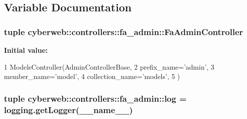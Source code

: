 \subsection{\-Variable \-Documentation}
\hypertarget{namespacecyberweb_1_1controllers_1_1fa__admin_ac7a3e431d03b1d894e586decd1ca3787}{
\subsubsection[{\-Fa\-Admin\-Controller}]{\setlength{\rightskip}{0pt plus 5cm}tuple {\bf cyberweb\-::controllers\-::fa\-\_\-admin\-::\-Fa\-Admin\-Controller}}}\label{namespacecyberweb_1_1controllers_1_1fa__admin_ac7a3e431d03b1d894e586decd1ca3787}
{\bfseries \-Initial value\-:}
\begin{DoxyCode}
1 ModelsController(AdminControllerBase,
2                                    prefix_name='admin',
3                                    member_name='model',
4                                    collection_name='models',
5                                   )
\end{DoxyCode}
\hypertarget{namespacecyberweb_1_1controllers_1_1fa__admin_a2b4a9ca0cc2ec112076b1dd88bf56bbb}{
\subsubsection[{log}]{\setlength{\rightskip}{0pt plus 5cm}tuple {\bf cyberweb\-::controllers\-::fa\-\_\-admin\-::log} = logging.\-get\-Logger(\-\_\-\-\_\-name\-\_\-\-\_\-)}}\label{namespacecyberweb_1_1controllers_1_1fa__admin_a2b4a9ca0cc2ec112076b1dd88bf56bbb}
